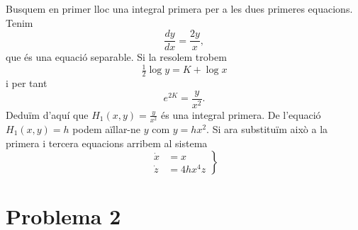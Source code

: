 \documentclass[12pt]{article}
\numberwithin{table}{section}
\numberwithin{equation}{section}
\numberwithin{figure}{section}
\begin{document}
Busquem en primer lloc una integral primera per a les dues primeres equacions. Tenim
\begin{equation*}
	\frac{dy}{dx} = \frac{2y}{x},
\end{equation*}
que és una equació separable. Si la resolem trobem
\begin{equation*}
	\tfrac{1}{2}\log{y} = K + \log{x}
\end{equation*}
i per tant
\begin{equation*}
	e^{2K} = \frac{y}{x^2}.
\end{equation*}
Deduïm d'aquí que \( H_1(x,y) = \frac{y}{x^2} \) és una integral primera. De l'equació \( H_1(x,y) = h \) podem aïllar-ne \( y \) com \( y = hx^2 \). Si ara substituïm això a la primera i tercera equacions arribem al sistema
\begin{equation*}
	\left. 	
		\begin{aligned}
			\dot{x} & = x \\
			\dot{z} & = 4hx^4z
		\end{aligned}
	\right\}
\end{equation*}


\addtocounter{section}{2}
\addtocounter{section}{-1}
\setcounter{equation}{0}
\section*{Problema 2}
\end{document}

